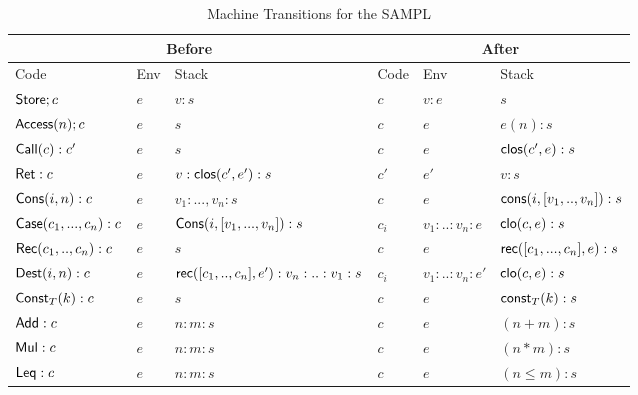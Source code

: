 \documentclass[11pt]{article}
\newcommand{\<}{\langle}
\renewcommand{\>}{\rangle}
\begin{document}

\begin{table}[!h]
\begin{center}
    \begin{tabular}{|l|l|l||l|l|l|}
    \hline 
      \multicolumn{3}{|c||}{Before} 
     & \multicolumn{3}{c|}{After} \\ \hline    
   Code   & Env  & Stack      
                      &Code   & Env  & Stack     \\ \hline
         ${\sf Store};c$   &$ e$    & $v:s$          
                     & $c$           & $v:e$    & $s$     \\ \hline   
        ${\sf Access}(n);c$   &$ e$    & $s$          
                     & $c$           & $e$    & $e(n):s$     \\ \hline    
      ${\sf Call}(c):c'$         & $e$    & $s$  
                     & $c$          & $e$   & ${\sf clos}(c',e):s$        \\ \hline              
    ${\sf Ret}:c$         & $e$    & $v:{\sf clos}(c',e'):s$  
                     & $c'$          & $e'$   & $v:s$        \\ \hline \hline  
         ${\sf Cons}(i,n):c $ & $e$    & $v_1:...,v_n:s$      
                     & $c$           &$ e$    & ${\sf cons}(i,[v_1,..,v_n]):s$    \\ \hline      
          ${\sf Case}(c_1,...,c_n):c $ & $e$ & ${\sf Cons}(i,[v_1,...,v_n]):s$ 
                     & $c_i$ & $v_1:..:v_n:e$ & ${\sf clo}(c,e):s$ \\ \hline \hline
     ${\sf Rec}(c_1,..,c_n):c$      & $e$   & $s$         
                     & $c$           & $e$    & ${\sf rec}([c_1,...,c_n],e):s$    \\ \hline
     ${\sf Dest}(i,n):c$         & $e$    & ${\sf rec}([c_1,..,c_n],e'):v_n:..:v_1:s$ 
                     & $ c_i$          & $v_1:..:v_n:e'$  & ${\sf clo}(c,e):s$      \\ \hline \hline
     ${\sf Const}_T(k):c $ & $e$    & $s$      
                     & $c$           &$ e$    & ${\sf const}_T(k):s$    \\ \hline      
     ${\sf Add}:c$         & $e$    & $n:m:s$      
                     & $c $          & $e$    & $(n+m):s$    \\ \hline                  
     ${\sf Mul}:c$         & $e$    & $n:m:s$      
                     & $c $          & $e$    & $(n*m):s$    \\ \hline 
     ${\sf Leq}:c$         & $e$    & $n:m:s$      
                     & $c $          & $e$    & $(n \leq m):s$    \\ \hline  
   \end{tabular}
\caption{Machine Transitions for the SAMPL}
\label{AMPL:TranSeqTable}
\end{center}
\end{table}
\end{document}
